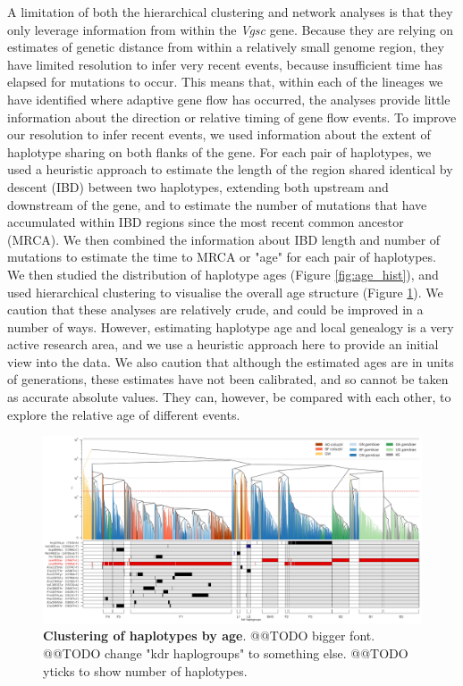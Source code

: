 \documentclass[a4paper,11pt,abstracton]{scrartcl}
\begin{document}
%
A limitation of both the hierarchical clustering and network analyses is that they only leverage information from within the \textit{Vgsc} gene. 
%
Because they are relying on estimates of genetic distance from within a relatively small genome region, they have limited resolution to infer very recent events, because insufficient time has elapsed for mutations to occur.
%
This means that, within each of the lineages we have identified where adaptive gene flow has occurred, the analyses provide little information about the direction or relative timing of gene flow events.
%
To improve our resolution to infer recent events, we used information about the extent of haplotype sharing on both flanks of the gene.
%
For each pair of haplotypes, we used a heuristic approach to estimate the length of the region shared identical by descent (IBD) between two haplotypes, extending both upstream and downstream of the gene, and to estimate the number of mutations that have accumulated within IBD regions since the most recent common ancestor (MRCA).
%
We then combined the information about IBD length and number of mutations to estimate the time to MRCA or "age" for each pair of haplotypes.
%
We then studied the distribution of haplotype ages (Figure \ref{fig:age_hist}), and used hierarchical clustering to visualise the overall age structure (Figure \ref{fig:tree}).
%
We caution that these analyses are relatively crude, and could be improved in a number of ways. 
%
However, estimating haplotype age and local genealogy is a very active research area, and we use a heuristic approach here to provide an initial view into the data.
%
We also caution that although the estimated ages are in units of generations, these estimates have not been calibrated, and so cannot be taken as accurate absolute values.
%
They can, however, be compared with each other, to explore the relative age of different events.
%


%
\begin{figure}[!b]
  \includegraphics[width=1.1\linewidth,center]{artwork/Figure_1a_Clado.jpeg}
  \caption{\textbf{Clustering of haplotypes by age}. @@TODO bigger font. @@TODO change "kdr haplogroups" to something else. @@TODO yticks to show number of haplotypes.}
  \label{fig:tree}
\end{figure}
\end{document}
